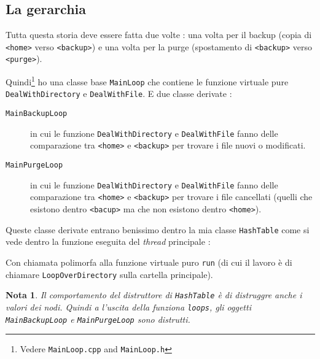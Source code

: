 \documentclass[a4paper,12pt]{article}
\newcounter{numtho}
\newtheorem{remark}[numtho]{Nota}
\newcommand{\info}[1]{\texttt{#1}}
\begin{document}
\subsection{La gerarchia}

Tutta questa storia deve essere fatta due volte : una volta per il backup (copia di \info{<home>} verso \info{<backup>}) e una volta per la purge (spostamento di \info{<backup>} verso \info{<purge>}).

Quindi\footnote{Vedere \info{MainLoop.cpp} and \info{MainLoop.h}} ho una classe base \info{MainLoop} che contiene le funzione virtuale pure \info{DealWithDirectory} e \info{DealWithFile}. E due classe derivate :

\begin{description}
    \item[\info{MainBackupLoop}] in cui le funzione \info{DealWithDirectory} e \info{DealWithFile} fanno delle comparazione tra \info{<home>} e \info{<backup>} per trovare i file nuovi o modificati.
    \item[\info{MainPurgeLoop}] in cui le funzione \info{DealWithDirectory} e \info{DealWithFile} fanno delle comparazione tra \info{<home>} e \info{<backup>} per trovare i file cancellati (quelli che esistono dentro \info{<bacup>} ma che non esistono dentro \info{<home>}).
\end{description}

Queste classe derivate entrano benissimo dentro la mia classe \info{HashTable} come si vede dentro la funzione eseguita del \emph{thread} principale :



Con chiamata polimorfa alla funzione virtuale puro \info{run} (di cui il lavoro è di chiamare \info{LoopOverDirectory} sulla cartella principale).

\begin{remark}
    Il comportamento del distruttore di \info{HashTable} è di distruggre anche i valori dei nodi. Quindi a l'uscita della funziona \info{loops}, gli oggetti \info{MainBackupLoop} e \info{MainPurgeLoop} sono distrutti.
\end{remark}

\end{document}
